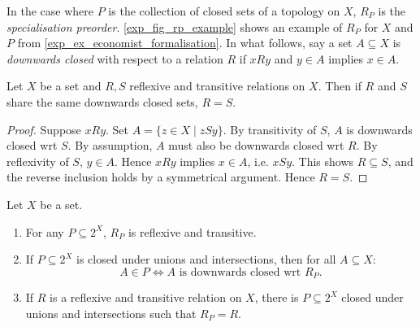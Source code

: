 In the case where $P$ is the collection of closed sets of a topology on $X$,
$R_P$ is the \emph{specialisation preorder}.
%
\cref{exp_fig_rp_example} shows an example of $R_P$ for $X$ and $P$ from
\cref{exp_ex_economist_formalisation}.
%
In what follows, say a set $A \subseteq X$ is \emph{downwards closed} with
respect to a relation $R$ if $xRy$ and $y \in A$ implies $x \in A$.

\begin{lemma}
\label{exp_lemma_same_dc_sets_implies_equality}
    Let $X$ be a set and $R, S$ reflexive and transitive relations on $X$. Then
    if $R$ and $S$ share the same downwards closed sets, $R = S$.
\end{lemma}
\begin{proof}
    Suppose $xRy$. Set $A = \{z \in X \mid zSy\}$. By transitivity of $S$, $A$
    is downwards closed wrt $S$.  By assumption, $A$ must also be downwards
    closed wrt $R$. By reflexivity of $S$, $y \in A$. Hence $xRy$ implies $x
    \in A$, i.e. $xSy$. This shows $R \subseteq S$, and the reverse inclusion
    holds by a symmetrical argument. Hence $R = S$.
\end{proof}

\begin{lemma}
\label{exp_lemma_p_to_rp_mapping}
    Let $X$ be a set.

    \begin{enumerate}
        \item\label{exp_item_rp_ref_and_tr} For any $P \subseteq 2^X$, $R_P$ is
            reflexive and transitive.

        \item\label{exp_item_rp_dc_property} If $P \subseteq 2^X$ is closed under
             unions and intersections, then for all $A \subseteq X$:
            \[
                A \in P \iff A \text{ is downwards closed wrt } R_P.
            \]

        \item\label{exp_item_rp_surjectivity} If $R$ is a reflexive and transitive
            relation on $X$, there is $P \subseteq 2^X$ closed under unions and
            intersections such that $R_P = R$.
    \end{enumerate}
\end{lemma}


